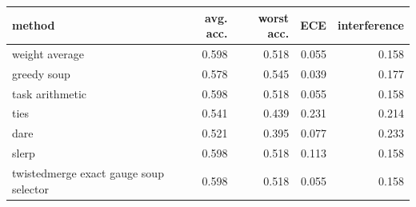 \begin{tabular}{lrrrr}
\toprule
method & avg. acc. & worst acc. & ECE & interference\\
\midrule
weight average & 0.598 & 0.518 & 0.055 & 0.158\\
greedy soup & 0.578 & 0.545 & 0.039 & 0.177\\
task arithmetic & 0.598 & 0.518 & 0.055 & 0.158\\
ties & 0.541 & 0.439 & 0.231 & 0.214\\
dare & 0.521 & 0.395 & 0.077 & 0.233\\
slerp & 0.598 & 0.518 & 0.113 & 0.158\\
twistedmerge exact gauge soup selector & 0.598 & 0.518 & 0.055 & 0.158\\
\bottomrule
\end{tabular}
